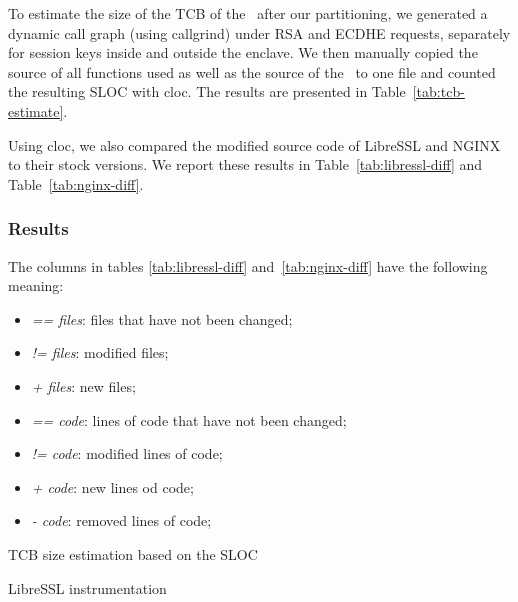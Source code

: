 \documentclass[../../../main.tex]{subfiles}
\begin{document}
\label{sec:tcb-analysis}
To estimate the size of the TCB of the \enclaveprogram~after our partitioning,
we generated a dynamic call graph (using callgrind) under RSA and ECDHE
requests, separately for session keys inside and outside the enclave. We then
manually copied the source of all functions used as well as the source of the
\enclaveprogram~to one file and counted the resulting SLOC with cloc. The
results are presented in Table~\ref{tab:tcb-estimate}.

Using cloc, we also compared the modified source code of LibreSSL and NGINX to
their stock versions. We report these results in Table~\ref{tab:libressl-diff}
and Table~\ref{tab:nginx-diff}.

\subsubsection*{Results}
The columns in tables \ref{tab:libressl-diff} and~\ref{tab:nginx-diff} have the following meaning:
\begin{itemize}
  \item \textit{\footnotesize == files}: files that have not been changed;
  \item \textit{\footnotesize != files}: modified files;
  \item \textit{\footnotesize + files}: new files;
  \item \textit{\footnotesize == code}: lines of code that have not been
    changed;
  \item \textit{\footnotesize != code}:  modified lines of code;
  \item \textit{\footnotesize + code}: new lines od code;
  \item \textit{\footnotesize - code}: removed lines of code;
\end{itemize}

\begin{table}[H]
  \center
  \footnotesize
  \caption{TCB size estimation based on the SLOC}
  \label{tab:tcb-estimate}
\end{table}

\begin{table}[H]
  \caption{LibreSSL instrumentation}
  \label{tab:libressl-diff}
\end{table}
\end{document}
